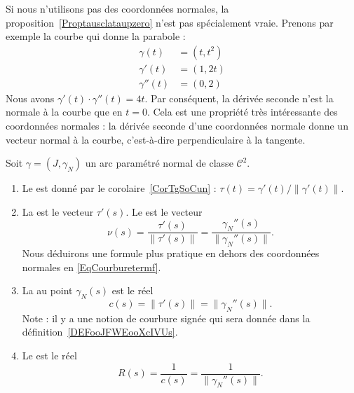 \begin{remark}
	Si nous n'utilisons pas des coordonnées normales, la proposition~\ref{Proptausclataupzero} n'est pas spécialement vraie. Prenons par exemple la courbe qui donne la parabole :
	\begin{subequations}
		\begin{align}
			\gamma(t)   & =(t,t^2) \\
			\gamma'(t)  & =(1,2t)  \\
			\gamma''(t) & =(0,2)
		\end{align}
	\end{subequations}
	Nous avons \( \gamma'(t)\cdot \gamma''(t)=4t\). Par conséquent, la dérivée seconde n'est la normale à la courbe que en \( t=0\). Cela est une propriété très intéressante des coordonnées normales : la dérivée seconde d'une coordonnées normale donne un vecteur normal à la courbe, c'est-à-dire perpendiculaire à la tangente.
\end{remark}

\begin{definition}      \label{DefCourbureNormleUnit}
	Soit \( \gamma=(J,\gamma_N)\) un arc paramétré normal de classe \( \mathcal{C}^2\).
	\begin{enumerate}
		\item
		      Le  est donné par le corolaire~\ref{CorTgSoCun} : \( \tau(t)=\gamma'(t)/\| \gamma'(t) \|\).
		\item
		      La  est le vecteur \( \tau'(s)\). Le  est le vecteur
		      \begin{equation}
			      \nu(s)=\frac{ \tau'(s) }{ \| \tau'(s) \| }=\frac{ \gamma_N''(s) }{ \| \gamma_N''(s) \| }.
		      \end{equation}
		      Nous déduirons une formule plus pratique en dehors des coordonnées normales en \eqref{EqCourburetermf}.
		\item
		      La  au point \( \gamma_N(s)\) est le réel
		      \begin{equation}
			      c(s)=\| \tau'(s) \|=\| \gamma_N''(s) \|.
		      \end{equation}
		      Note : il y a une notion de courbure signée qui sera donnée dans la définition~\ref{DEFooJFWEooXcIVUs}.
		\item
		      Le  est le réel
		      \begin{equation}
			      R(s)=\frac{1}{ c(s) }=\frac{1}{ \| \gamma_N''(s) \| }.
		      \end{equation}
	\end{enumerate}
\end{definition}

